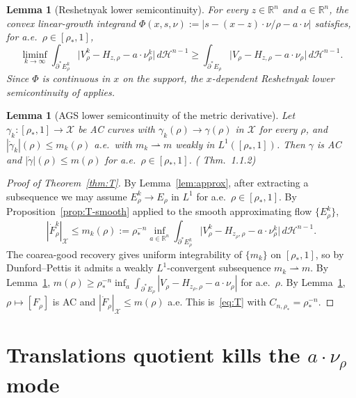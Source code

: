 \documentclass[11pt]{article}
\newtheorem{lemma}[theorem]{Lemma}
\theoremstyle{definition}
\newcommand{\R}{\mathbb{R}}
\newcommand{\rstar}{\rho_{*}}
\newcommand{\X}{\mathcal X}
\begin{document}
\begin{lemma}[Reshetnyak lower semicontinuity]\label{lem:resh}
For every $z\in\R^n$ and $a\in\R^n$, the convex linear-growth integrand
$\Phi(x,s,\nu):=|s-(x-z)\cdot\nu/\rho-a\cdot\nu|$ satisfies, for a.e.\
$\rho\in[\rstar,1]$,
\begin{equation}\label{eq:resh}
   \liminf_{k\to\infty}\int_{\partial^*E_\rho^k}
       \bigl|V_\rho^k-H_{z,\rho}-a\cdot\nu_\rho^k\bigr|\,d\mathcal H^{n-1}
   \ge
   \int_{\partial^*E_\rho}
       \bigl|V_\rho-H_{z,\rho}-a\cdot\nu_\rho\bigr|\,d\mathcal H^{n-1}.
\end{equation}
Since $\Phi$ is continuous in $x$ on the support, the $x$-dependent
Reshetnyak lower semicontinuity of \cite[Thm.~2.39]{AFP2000} applies.
\end{lemma}

\begin{lemma}[AGS lower semicontinuity of the metric derivative]\label{lem:AGS}
Let $\gamma_k:[\rstar,1]\to\X$ be AC curves with $\gamma_k(\rho)\to
\gamma(\rho)$ in $\X$ for every $\rho$, and $|\dot\gamma_k|(\rho)\le m_k(\rho)$
a.e.\ with $m_k\rightharpoonup m$ weakly in $L^1([\rstar,1])$. Then
$\gamma$ is AC and $|\dot\gamma|(\rho)\le m(\rho)$ for a.e.\
$\rho\in[\rstar,1]$. (\cite{AGS2008} Thm.~1.1.2)
\end{lemma}

\begin{proof}[Proof of Theorem~\ref{thm:T}]
By Lemma~\ref{lem:approx}, after extracting a subsequence we may assume
$E_\rho^k\to E_\rho$ in $L^1$ for a.e.\
$\rho\in[\rstar,1]$. By Proposition~\ref{prop:T-smooth} applied to the
smooth approximating flow $\{E_\rho^k\}$,
\begin{equation}\label{eq:Tk}
   |\dot F_\rho^k|_\X\le m_k(\rho):=\rstar^{-n}\inf_{a\in\R^n}
   \int_{\partial^*E_\rho^k}\bigl|V_\rho^k-H_{z_\rho,\rho}-a\cdot\nu_\rho^k\bigr|
   \,d\mathcal H^{n-1}.
\end{equation}
The coarea-good recovery gives uniform integrability of $\{m_k\}$ on
$[\rstar,1]$, so by Dunford--Pettis it admits a weakly $L^1$-convergent
subsequence $m_k\rightharpoonup m$. By
Lemma~\ref{lem:resh}, $m(\rho)\ge\rstar^{-n}\inf_a\int_{\partial^*E_\rho}
|V_\rho-H_{z_\rho,\rho}-a\cdot\nu_\rho|$ for a.e.\ $\rho$. By
Lemma~\ref{lem:AGS}, $\rho\mapsto[F_\rho]$ is AC and $|\dot F_\rho|_\X\le m(\rho)$
a.e. This is~\eqref{eq:T} with $C_{n,\rstar}=\rstar^{-n}$.
\end{proof}

\section{Translations quotient kills the $a\cdot\nu_\rho$ mode}\label{sec:trans}
\end{document}

